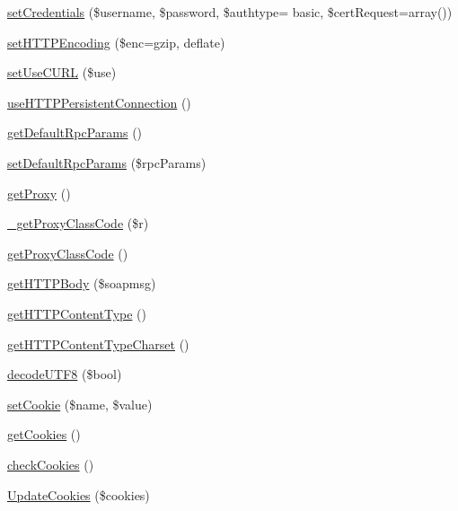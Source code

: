 \begin{DoxyCompactItemize}
\item 
\hyperlink{classnusoap__client_ada213133d177c1c9c07435d65e89e735}{set\+Credentials} (\$username, \$password, \$authtype= \textquotesingle{}basic\textquotesingle{}, \$cert\+Request=array())
\item 
\hyperlink{classnusoap__client_a9528927202777242800c394fadc03191}{set\+H\+T\+T\+P\+Encoding} (\$enc=\textquotesingle{}gzip, deflate\textquotesingle{})
\item 
\hyperlink{classnusoap__client_ae0907a30339d32d93ebc4ba9c436d4de}{set\+Use\+C\+U\+R\+L} (\$use)
\item 
\hyperlink{classnusoap__client_a6558d144faf99ccc9ef4621ffd56bd75}{use\+H\+T\+T\+P\+Persistent\+Connection} ()
\item 
\hyperlink{classnusoap__client_a95ae30619429aa7d1c93f21e33300419}{get\+Default\+Rpc\+Params} ()
\item 
\hyperlink{classnusoap__client_a9d7b3609d1db3eb5f2d3cf92510e4e6b}{set\+Default\+Rpc\+Params} (\$rpc\+Params)
\item 
\hyperlink{classnusoap__client_a839ac5be1fce2af15c73aef02a49a8af}{get\+Proxy} ()
\item 
\hyperlink{classnusoap__client_a2b49882c792a4deb80ec35ca75f1fee6}{\+\_\+get\+Proxy\+Class\+Code} (\$r)
\item 
\hyperlink{classnusoap__client_a5fbf58b6ba27a02544885d4fc801d328}{get\+Proxy\+Class\+Code} ()
\item 
\hyperlink{classnusoap__client_ab1e22b0858bdbe61d2d711ff442c0e78}{get\+H\+T\+T\+P\+Body} (\$soapmsg)
\item 
\hyperlink{classnusoap__client_a2bed19ef2d537dee244535339cd6026a}{get\+H\+T\+T\+P\+Content\+Type} ()
\item 
\hyperlink{classnusoap__client_a9051db33a9b7e50315d9222ef1c52ce9}{get\+H\+T\+T\+P\+Content\+Type\+Charset} ()
\item 
\hyperlink{classnusoap__client_a8ebcfd008049181e64a5046eb8c168b9}{decode\+U\+T\+F8} (\$bool)
\item 
\hyperlink{classnusoap__client_a3f05f631ff936a033cae038052d9e7f9}{set\+Cookie} (\$name, \$value)
\item 
\hyperlink{classnusoap__client_a374b645410526cbbb498b140242a00ba}{get\+Cookies} ()
\item 
\hyperlink{classnusoap__client_a6a8794beffec4a05daa7559ab233875e}{check\+Cookies} ()
\item 
\hyperlink{classnusoap__client_ad71447ce0ee50309eea6ce0e12a88e02}{Update\+Cookies} (\$cookies)
\item 

\end{DoxyCompactItemize}
